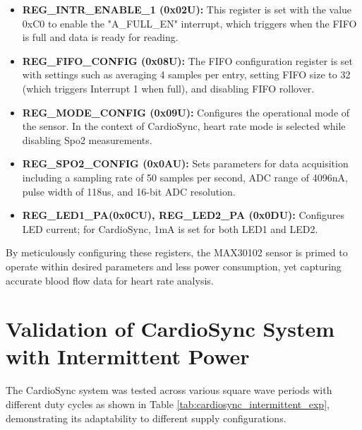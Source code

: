 \begin{itemize}
    \item \textbf{REG\_INTR\_ENABLE\_1 (0x02U):} This register is set with the value 0xC0 to enable the "A\_FULL\_EN" interrupt, which triggers when the FIFO is full and data is ready for reading.
    
    \item \textbf{REG\_FIFO\_CONFIG (0x08U):} The FIFO configuration register is set with settings such as averaging 4 samples per entry, setting FIFO size to 32 (which triggers Interrupt 1 when full), and disabling FIFO rollover.
    
    \item \textbf{REG\_MODE\_CONFIG (0x09U):} Configures the operational mode of the sensor. In the context of CardioSync, heart rate mode is selected while disabling Spo2 measurements.
    
    \item \textbf{REG\_SPO2\_CONFIG (0x0AU):} Sets parameters for data acquisition including a sampling rate of 50 samples per second, ADC range of 4096nA, pulse width of 118us, and 16-bit ADC resolution.
    
    \item \textbf{REG\_LED1\_PA(0x0CU), REG\_LED2\_PA (0x0DU):} Configures LED current; for CardioSync, 1mA is set for both LED1 and LED2.
\end{itemize}

\noindent By meticulously configuring these registers, the MAX30102 sensor is primed to operate within desired parameters and less power consumption, yet capturing accurate blood flow data for heart rate analysis.

\section{Validation of CardioSync System with Intermittent Power}
The CardioSync system was tested across various square wave periods with different duty cycles as shown in Table \ref{tab:cardiosync_intermittent_exp}, demonstrating its adaptability to different supply configurations.

